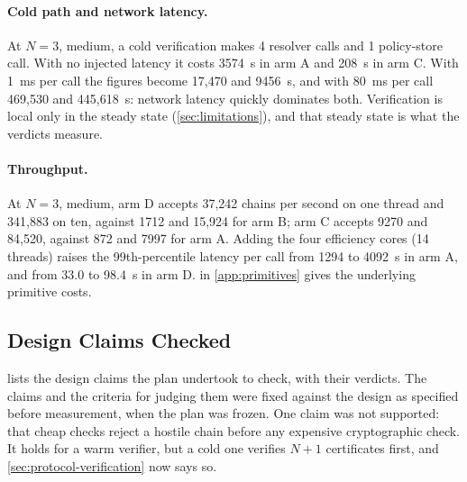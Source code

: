 \documentclass[11pt,a4paper]{article}
\begin{document}
\paragraph{Cold path and network latency.}
At $N = 3$, medium, a cold verification makes 4 resolver calls and 1
policy-store call. With no injected latency it costs 3574~\textmu{}s in
arm A and 208~\textmu{}s in arm C. With 1~ms per call the figures become
17,470 and 9456~\textmu{}s, and with 80~ms per call 469,530 and
445,618~\textmu{}s: network latency quickly dominates both. Verification
is local only in the steady state (\cref{sec:limitations}), and that
steady state is what the verdicts measure.

\paragraph{Throughput.}
At $N = 3$, medium, arm D accepts 37,242 chains per second on one thread
and 341,883 on ten, against 1712 and 15,924 for arm B; arm C accepts 9270
and 84,520, against 872 and 7997 for arm A. Adding the four efficiency
cores (14 threads) raises the 99th-percentile latency per call from
1294 to 4092~\textmu{}s in arm A, and from 33.0 to 98.4~\textmu{}s in
arm D.  in \cref{app:primitives} gives the
underlying primitive costs.

\subsection{Design Claims Checked}
\label{sec:eval-claims}

 lists the design claims the plan undertook to check,
with their verdicts. The claims and the criteria for judging them were
fixed against the design as specified before measurement, when the plan
was frozen. One claim was not supported: that cheap checks reject a
hostile chain before any expensive cryptographic check. It holds for a
warm verifier, but a cold one verifies $N + 1$ certificates first, and
\cref{sec:protocol-verification} now says so.

\begin{table}[t]
\centering
\small
\caption{Design claims and their verdicts. The claims and the criteria
for judging them were fixed when the plan was frozen, and the verdicts
were judged against the text as it stood then. The ``Paper'' column
gives the section of this paper where each claim now stands.}
\label{tab:claims}
\end{table}
\end{document}
